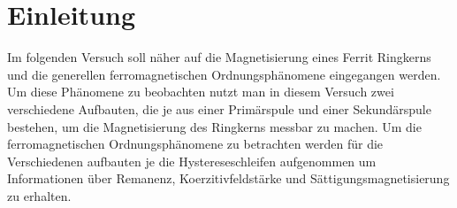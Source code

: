 \section{Einleitung}
    Im folgenden Versuch soll näher auf die Magnetisierung eines Ferrit Ringkerns und die generellen ferromagnetischen Ordnungsphänomene
    eingegangen werden. Um diese Phänomene zu beobachten nutzt man in diesem Versuch zwei verschiedene Aufbauten, die je aus einer Primärspule und einer Sekundärspule bestehen,
    um die Magnetisierung des Ringkerns messbar zu machen. Um die ferromagnetischen Ordnungsphänomene zu betrachten werden für die Verschiedenen aufbauten je die Hystereseschleifen aufgenommen
    um Informationen über Remanenz, Koerzitivfeldstärke und Sättigungsmagnetisierung zu erhalten. 